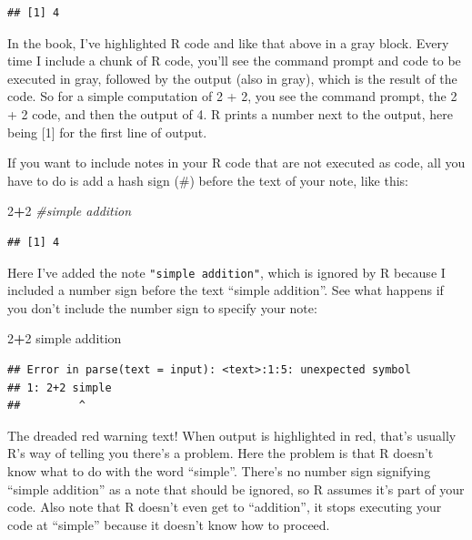 \documentclass[
]{book}
\newenvironment{Shaded}{\begin{snugshade}}{\end{snugshade}}
\newcommand{\CommentTok}[1]{\textcolor[rgb]{0.56,0.35,0.01}{\textit{#1}}}
\newcommand{\DecValTok}[1]{\textcolor[rgb]{0.00,0.00,0.81}{#1}}
\newcommand{\NormalTok}[1]{#1}
\newcommand{\SpecialCharTok}[1]{\textcolor[rgb]{0.81,0.36,0.00}{\textbf{#1}}}
\begin{document}
\begin{verbatim}
## [1] 4
\end{verbatim}

In the book, I've highlighted R code and like that above in a gray block. Every time I include a chunk of R code, you'll see the command prompt and code to be executed in gray, followed by the output (also in gray), which is the result of the code. So for a simple computation of 2 + 2, you see the command prompt, the 2 + 2 code, and then the output of 4. R prints a number next to the output, here being {[}1{]} for the first line of output.

If you want to include notes in your R code that are not executed as code, all you have to do is add a hash sign (\#) before the text of your note, like this:

\begin{Shaded}
\begin{Highlighting}[]
\DecValTok{2}\SpecialCharTok{+}\DecValTok{2} \CommentTok{\#simple addition}
\end{Highlighting}
\end{Shaded}

\begin{verbatim}
## [1] 4
\end{verbatim}

Here I've added the note \texttt{"simple\ addition"}, which is ignored by R because I included a number sign before the text ``simple addition''. See what happens if you don't include the number sign to specify your note:

\begin{Shaded}
\begin{Highlighting}[]
\DecValTok{2}\SpecialCharTok{+}\DecValTok{2}\NormalTok{ simple addition}
\end{Highlighting}
\end{Shaded}

\begin{verbatim}
## Error in parse(text = input): <text>:1:5: unexpected symbol
## 1: 2+2 simple
##         ^
\end{verbatim}

The dreaded red warning text! When output is highlighted in red, that's usually R's way of telling you there's a problem. Here the problem is that R doesn't know what to do with the word ``simple''. There's no number sign signifying ``simple addition'' as a note that should be ignored, so R assumes it's part of your code. Also note that R doesn't even get to ``addition'', it stops executing your code at ``simple'' because it doesn't know how to proceed.
\end{document}
